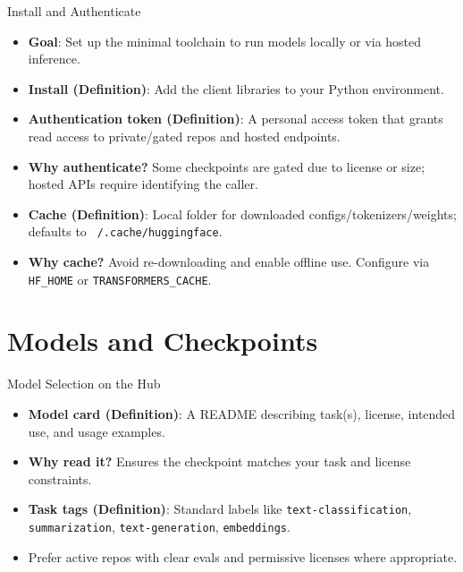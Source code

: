 \documentclass[aspectratio=169]{beamer}
\begin{document}
\begin{frame}[fragile]{Install and Authenticate}
  \begin{itemize}
    \item \textbf{Goal}: Set up the minimal toolchain to run models locally or via hosted inference.
    \item \textbf{Install (Definition)}: Add the client libraries to your Python environment.
    \item \textbf{Authentication token (Definition)}: A personal access token that grants read access to private/gated repos and hosted endpoints.
    \item \textbf{Why authenticate?} Some checkpoints are gated due to license or size; hosted APIs require identifying the caller.
    \item \textbf{Cache (Definition)}: Local folder for downloaded configs/tokenizers/weights; defaults to \texttt{~/.cache/huggingface}.
    \item \textbf{Why cache?} Avoid re-downloading and enable offline use. Configure via \texttt{HF\_HOME} or \texttt{TRANSFORMERS\_CACHE}.
  \end{itemize}
\end{frame}

\section{Models and Checkpoints}

\begin{frame}{Model Selection on the Hub}
  \begin{itemize}
    \item \textbf{Model card (Definition)}: A README describing task(s), license, intended use, and usage examples.
    \item \textbf{Why read it?} Ensures the checkpoint matches your task and license constraints.
    \item \textbf{Task tags (Definition)}: Standard labels like \texttt{text-classification}, \texttt{summarization}, \texttt{text-generation}, \texttt{embeddings}.
   \item Prefer active repos with clear evals and permissive licenses where appropriate.
  \end{itemize}
\end{frame}
\end{document}
